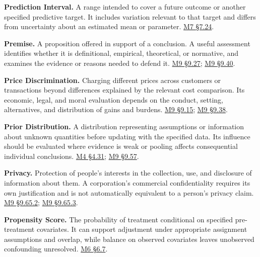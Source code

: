 \noindent\textbf{Prediction Interval.} A range intended to cover a future outcome
or another specified predictive target. It includes variation relevant
to that target and differs from uncertainty about an estimated mean or
parameter.
\href{Marketing_Analytics_Lecture_Notes.pdf\#M07-demand-intervals-and-the-distribution-of-forecast-errors}{M7
§7.24}.

\noindent\textbf{Premise.} A proposition offered in support of a conclusion. A
useful assessment identifies whether it is definitional, empirical,
theoretical, or normative, and examines the evidence or reasons needed
to defend it.
\hyperref[M09-logical-assessment-of-an-empirical-argument]{M9
§9.27};
\hyperref[M09-logical-consequence-and-a-defensible-recommendation]{M9
§9.40}.

\noindent\textbf{Price Discrimination.} Charging different prices across
customers or transactions beyond differences explained by the relevant
cost comparison. Its economic, legal, and moral evaluation depends on
the conduct, setting, alternatives, and distribution of gains and
burdens.
\hyperref[M09-pricing-policy-what-conduct-is-being-evaluated]{M9
§9.15};
\hyperref[M09-pricing-evidence-in-a-u.s.-antitrust-case]{M9
§9.38}.

\noindent\textbf{Prior Distribution.} A distribution representing assumptions or
information about unknown quantities before updating with the specified
data. Its influence should be evaluated where evidence is weak or
pooling affects consequential individual conclusions.
\href{Marketing_Analytics_Lecture_Notes.pdf\#M04-released-retail-data-integrated-heterogeneity-and-competing-explanations}{M4
§4.31};
\hyperref[M09-heterogeneity-and-the-interpretation-of-consumer-harm]{M9
§9.57}.

\noindent\textbf{Privacy.} Protection of people's interests in the collection,
use, and disclosure of information about them. A corporation's
commercial confidentiality requires its own justification and is not
automatically equivalent to a person's privacy claim.
\hyperref[M09-corporate-duties-and-human-protections]{M9
§9.65.2};
\hyperref[M09-a-philosophical-argument-against-protective-secrecy]{M9
§9.65.3}.

\noindent\textbf{Propensity Score.} The probability of treatment conditional on
specified pre-treatment covariates. It can support adjustment under
appropriate assignment assumptions and overlap, while balance on
observed covariates leaves unobserved confounding unresolved.
\href{Marketing_Analytics_Lecture_Notes.pdf\#M06-observational-adjustment-and-its-limits}{M6
§6.7}.

